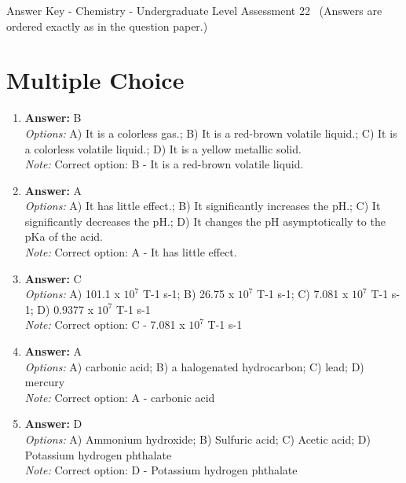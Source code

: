 \documentclass[12pt]{article}
\begin{document}
\begin{center}
Answer Key - Chemistry - Undergraduate Level Assessment 22 \
\small (Answers are ordered exactly as in the question paper.)
\end{center}

\section*{Multiple Choice}
\begin{enumerate}[label=\arabic*.]
\item \textbf{Answer:} B
\\ \textit{Options:} A) It is a colorless gas.; B) It is a red-brown volatile liquid.; C) It is a colorless volatile liquid.; D) It is a yellow metallic solid.
\\ \textit{Note:} Correct option: B - It is a red-brown volatile liquid.
\item \textbf{Answer:} A
\\ \textit{Options:} A) It has little effect.; B) It significantly increases the pH.; C) It significantly decreases the pH.; D) It changes the pH asymptotically to the pKa of the acid.
\\ \textit{Note:} Correct option: A - It has little effect.
\item \textbf{Answer:} C
\\ \textit{Options:} A) 101.1 x $10^7$ T-1 s-1; B) 26.75 x $10^7$ T-1 s-1; C) 7.081 x $10^7$ T-1 s-1; D) 0.9377 x $10^7$ T-1 s-1
\\ \textit{Note:} Correct option: C - 7.081 x $10^7$ T-1 s-1
\item \textbf{Answer:} A
\\ \textit{Options:} A) carbonic acid; B) a halogenated hydrocarbon; C) lead; D) mercury
\\ \textit{Note:} Correct option: A - carbonic acid
\item \textbf{Answer:} D
\\ \textit{Options:} A) Ammonium hydroxide; B) Sulfuric acid; C) Acetic acid; D) Potassium hydrogen phthalate
\\ \textit{Note:} Correct option: D - Potassium hydrogen phthalate
\end{enumerate}
\end{document}
